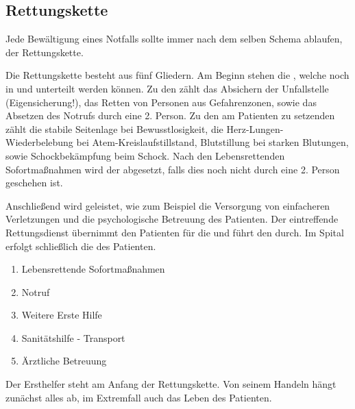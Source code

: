 \subsection{Rettungskette}
\label{topic:rettungskette}


Jede Bewältigung eines Notfalls sollte immer nach dem
selben Schema ablaufen, der Rettungskette.



{
Die Rettungskette besteht aus fünf Gliedern. Am Beginn
stehen die , welche noch
in  und  unterteilt werden
können. Zu den  zählt das
Absichern der Unfallstelle (Eigensicherung!), das Retten von
Personen aus Gefahrenzonen, sowie das Absetzen des Notrufs
durch eine 2. Person. Zu den am Patienten zu setzenden
 zählt die stabile
Seitenlage bei Bewusstlosigkeit, die
Herz-Lungen-Wiederbelebung bei Atem-Kreislaufstillstand,
Blutstillung bei starken Blutungen, sowie Schockbekämpfung
beim Schock. Nach den Lebensrettenden Sofortmaßnahmen wird
der  abgesetzt, falls dies noch nicht durch eine
2. Person geschehen ist.

Anschließend wird  geleistet, wie
zum Beispiel die Versorgung von einfacheren Verletzungen und
die psychologische Betreuung des Patienten. Der eintreffende
Rettungsdienst übernimmt den Patienten für die
 und führt den  durch. Im
Spital erfolgt schließlich die  des
Patienten.

}{
\begin{enumerate}
  \item Lebensrettende Sofortmaßnahmen
  \item Notruf
  \item Weitere Erste Hilfe
  \item Sanitätshilfe - Transport
  \item Ärztliche Betreuung
\end{enumerate}
}
{}{}{}




Der Ersthelfer steht am Anfang der Rettungskette. Von seinem
Handeln hängt zunächst alles ab, im Extremfall auch das
Leben des Patienten.


